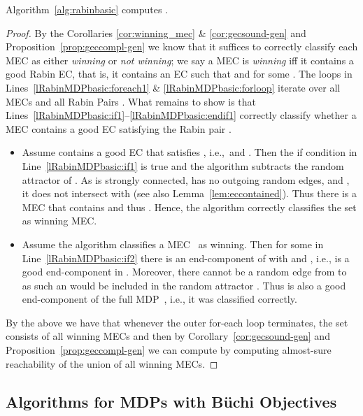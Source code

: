 \documentclass[11pt,letterpaper]{article}
\begin{document}
\begin{proposition}
    Algorithm~\ref{alg:rabinbasic} computes .
\end{proposition}
\begin{proof}
  By the Corollaries \ref{cor:winning_mec} \& \ref{cor:gecsound-gen} and Proposition~\ref{prop:geccompl-gen} we know that it 
  suffices to correctly classify each MEC as either \emph{winning} or \emph{not winning}; we say a MEC is \emph{winning} iff it contains a good Rabin EC, 
  that is, it contains 
  an EC  such that  and  for some .
  The loops in Lines~\ref{lRabinMDPbasic:foreach1} \& \ref{lRabinMDPbasic:forloop} iterate over all MECs 
  and all Rabin Pairs .
  What remains to show is that  
  Lines~\ref{lRabinMDPbasic:if1}--\ref{lRabinMDPbasic:endif1} correctly classify
  whether a MEC contains a good EC satisfying the Rabin pair .
 
  \begin{itemize}
    \item Assume  contains a good EC  that satisfies , i.e.,\
	   and .
	  Then the if condition in Line~\ref{lRabinMDPbasic:if1} is true and the algorithm subtracts the random attractor
	  of .
	  As  is strongly connected, has no outgoing random edges, and , 
	  it does not intersect with  (see also Lemma~\ref{lem:eccontained}).
	  Thus there is a MEC  that contains  and thus .
	  Hence, the algorithm correctly classifies the set  as winning MEC.
    \item Assume the algorithm classifies a MEC~ as winning. 
	  Then for some  in Line~\ref{lRabinMDPbasic:if2} there is an end-component 
	   of 
	  with  and ,
	  i.e.,  is a good end-component in .
	  Moreover, there cannot be a random edge from  to  as such an 
	  would be included in the random attractor .
	  Thus  is also a good end-component of the full MDP~,
	  i.e., it was classified correctly.	  
  \end{itemize}
  By the above we have that whenever the outer for-each loop terminates, the set  consists of all
  winning MECs and then by Corollary~\ref{cor:gecsound-gen} and Proposition~\ref{prop:geccompl-gen} we can compute 
   by computing almost-sure reachability
  of the union of all winning MECs.
\end{proof}

\subsection{Algorithms for MDPs with Büchi Objectives}
\label{sec:buchialg}
\end{document}
